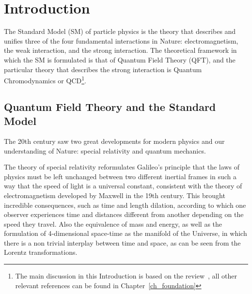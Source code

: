\chapter*{Introduction}

\label{ch_introduction}



The Standard Model (SM) of particle physics is the theory that describes and unifies three of the four fundamental interactions in Nature: electromagnetism, the weak interaction, and the strong interaction. The theoretical framework in which the SM is formulated is that of Quantum Field Theory (QFT), and the particular theory that describes the strong interaction is Quantum Chromodynamics or QCD\footnote{The main discussion in this Introduction is based on the review~\citep{Wilczek:1998ma}, all other relevant references can be found in Chapter~\ref{ch_foundation}}.

\section*{Quantum Field Theory and the Standard Model}

The 20th century saw two great developments for modern physics and our understanding of Nature: special relativity and quantum mechanics. 

The theory of special relativity reformulates Galileo's principle that the laws of physics must be left unchanged between two different inertial frames in such a way that the speed of light is a universal constant, consistent with the theory of electromagnetism developed by Maxwell in the 19th century. This brought incredible consequences, such as time and length dilation, according to which one observer experiences time and distances different from another depending on the speed they travel. Also the equivalence of mass and energy, as well as the formulation of 4-dimensional space-time as the manifold of the Universe, in which there is a non trivial interplay between time and space, as can be seen from the Lorentz transformations.

